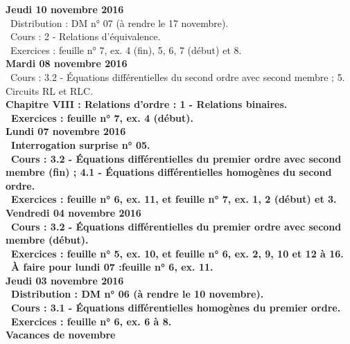 \documentclass[12pt,a4paper]{article}
\begin{document}
\noindent\textbf{Jeudi 10 novembre 2016}\\
\bu\ Distribution : DM n° 07 (à rendre le 17 novembre).\\
\bu\ Cours : 2 - Relations d'équivalence.\\
\bu\ Exercices : feuille n° 7, ex. 4 (fin), 5, 6, 7 (début) et 8.\vspace{.4cm}\\

\noindent\textbf{Mardi 08 novembre 2016}\\
\bu\ Cours : 3.2 - Équations différentielles du second ordre avec second membre ; 5. Circuits RL et RLC.\\
\bf Chapitre VIII \rm : Relations d'ordre : 1 - Relations binaires.\\
\bu\ Exercices : feuille n° 7, ex. 4 (début).\vspace{.4cm}\\

\noindent\textbf{Lundi 07 novembre 2016} \\
\bu\ Interrogation surprise n° 05.\\
\bu\ Cours : 3.2 - Équations différentielles du premier ordre avec second membre (fin) ; 4.1 - Équations 
différentielles homogènes du second ordre.\\
\bu\ Exercices : feuille n° 6, ex. 11, et feuille n° 7, ex. 1, 2 (début) et 3.\vspace{.4cm}\\

\noindent\textbf{Vendredi 04 novembre 2016}\\
\bu\ Cours : 3.2 - Équations différentielles du premier ordre avec 
second membre (début).\\
\bu\ Exercices : feuille n° 5, ex. 10, et feuille n° 6, ex. 2, 9, 10 et 12 à 16.\\
\bu\ À faire pour lundi 07 :feuille n° 6, ex. 11.\vspace{.4cm}\\

\noindent\textbf{Jeudi 03 novembre 2016}\\
\bu\ Distribution : DM n° 06 (à rendre le 10 novembre).\\
\bu\ Cours : 3.1 - Équations différentielles homogènes du premier ordre.\\
\bu\ Exercices : feuille n° 6, ex. 6 à 8.\vspace{.4cm}\\

\noindent\textbf{ Vacances de novembre }\vspace{.4cm}\\
\end{document}
